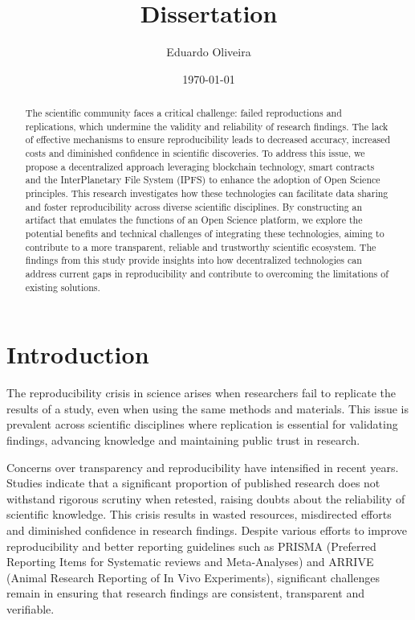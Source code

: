 \documentclass{article}
\title{Dissertation}
\author{Eduardo Oliveira}
\date{\today}
\begin{document}
\maketitle

\begin{abstract}
    The scientific community faces a critical challenge: failed reproductions and replications, which undermine the validity and reliability of research findings. The lack of effective mechanisms to ensure reproducibility leads to decreased accuracy, increased costs and diminished confidence in scientific discoveries. To address this issue, we propose a decentralized approach leveraging blockchain technology, smart contracts and the  InterPlanetary File System (IPFS) to enhance the adoption of Open Science principles. This research investigates how these technologies can facilitate data sharing and foster reproducibility across diverse scientific disciplines. By constructing an artifact that emulates the functions of an Open Science platform, we explore the potential benefits and technical challenges of integrating these technologies, aiming to contribute to a more transparent, reliable and trustworthy scientific ecosystem. The findings from this study provide insights into how decentralized technologies can address current gaps in reproducibility and contribute to overcoming the limitations of existing solutions.
\end{abstract}


\section{Introduction}


The reproducibility crisis in science arises when researchers fail to replicate the results of a study, even when using the same methods and materials. This issue is prevalent across scientific disciplines where replication is essential for validating findings, advancing knowledge and maintaining public trust in research.

Concerns over transparency and reproducibility have intensified in recent years. Studies indicate that a significant proportion of published research does not withstand rigorous scrutiny when retested, raising doubts about the reliability of scientific knowledge. This crisis results in wasted resources, misdirected efforts and diminished confidence in research findings. Despite various efforts to improve reproducibility and better reporting guidelines such as PRISMA (Preferred Reporting Items for Systematic reviews and Meta-Analyses) and ARRIVE (Animal Research Reporting of In Vivo Experiments), significant challenges remain in ensuring that research findings are consistent, transparent and verifiable.
\end{document}
